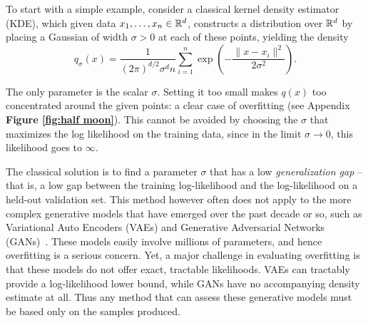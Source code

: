 To start with a simple example, consider a classical kernel density estimator (KDE), which given data $x_1, \ldots, x_n \in {\mathbb R}^d$, constructs a distribution over ${\mathbb R}^d$ by placing a Gaussian of width $\sigma > 0$ at each of these points, yielding the density
\begin{equation}\label{eq:kde}
q_{\sigma}(x) = \frac{1}{(2\pi)^{d/2}\sigma^d n} \sum_{i=1}^n  \exp\left( -\frac{\|x-x_i\|^2}{2 \sigma^2}\right) .
\end{equation}

The only parameter is the scalar $\sigma$. Setting it too small makes $q(x)$ too concentrated around the given points: a clear case of overfitting (see Appendix \textbf{Figure \ref{fig:half moon}}). This cannot be avoided by choosing the $\sigma$ that maximizes the log likelihood on the training data, since in the limit $\sigma \rightarrow 0$, this likelihood goes to $\infty$. 

The classical solution is to find a parameter $\sigma$ that has a low {\em{generalization gap}} -- that is, a low gap between the training log-likelihood and the log-likelihood on a held-out validation set. This method however often does not apply to the more complex generative models that have emerged over the past decade or so, such as Variational Auto Encoders (VAEs) \citep{kingma} and Generative Adversarial Networks (GANs)~\citep{goodfellow}. These models easily involve millions of parameters, and hence overfitting is a serious concern. Yet, a major challenge in evaluating overfitting is that these models do not offer exact, tractable likelihoods. VAEs can tractably provide a log-likelihood lower bound, while GANs have no accompanying density estimate at all. Thus any method that can assess these generative models must be based only on the samples produced. 


